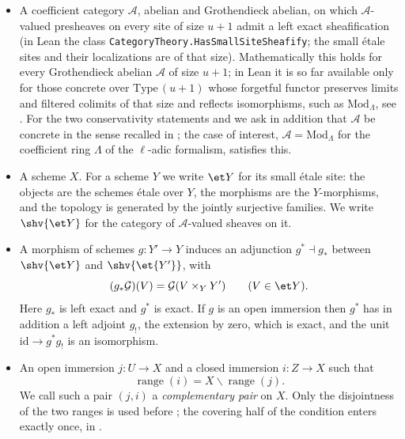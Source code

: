 \begin{itemize}
\item A coefficient category $\mathcal A$, abelian and Grothendieck abelian,
      on which $\mathcal A$-valued presheaves on every site of size $u+1$ admit
      a left exact sheafification (in Lean the class
      \texttt{CategoryTheory.HasSmallSiteSheafify}; the small \'etale sites and
      their localizations are of that size).  Mathematically this holds for
      every Grothendieck abelian $\mathcal A$ of size $u+1$; in Lean it is so
      far available only for those concrete over $\mathrm{Type}\,(u+1)$ whose
      forgetful functor preserves limits and filtered colimits of that size and
      reflects isomorphisms, such as $\mathrm{Mod}_\Lambda$, see
      .
      For the two conservativity statements
       and
       we ask in addition that $\mathcal A$
      be concrete in the sense recalled in
      ; the case of interest,
      $\mathcal A=\mathrm{Mod}_\Lambda$ for the coefficient ring $\Lambda$ of
      the $\ell$-adic formalism, satisfies this.
\item A scheme $X$.  For a scheme $Y$ we write $\et Y$ for its small \'etale
      site: the objects are the schemes \'etale over $Y$, the morphisms are
      the $Y$-morphisms, and the topology is generated by the jointly
      surjective families.  We write $\shv{\et Y}$ for the category of
      $\mathcal A$-valued sheaves on it.
\item A morphism of schemes $g\colon Y'\to Y$ induces an adjunction
      $g^*\dashv g_*$ between $\shv{\et Y}$ and $\shv{\et{Y'}}$, with
      \[
        (g_*\mathcal G)(V)=\mathcal G(V\times_YY')
        \qquad(V\in\et Y).
      \]
      Here $g_*$ is left exact and $g^*$ is exact.  If $g$ is an open
      immersion then $g^*$ has in addition a left adjoint $g_!$, the
      extension by zero, which is exact, and the unit
      $\mathrm{id}\to g^*g_!$ is an isomorphism.
\item An open immersion $j\colon U\to X$ and a closed immersion
      $i\colon Z\to X$ such that
      \[
        \operatorname{range}(i)=X\smallsetminus\operatorname{range}(j).
      \]
      We call such a pair $(j,i)$ a \emph{complementary pair} on $X$.  Only
      the disjointness of the two ranges is used before
      ; the covering half of the
      condition enters exactly once, in
      .
\end{itemize}

